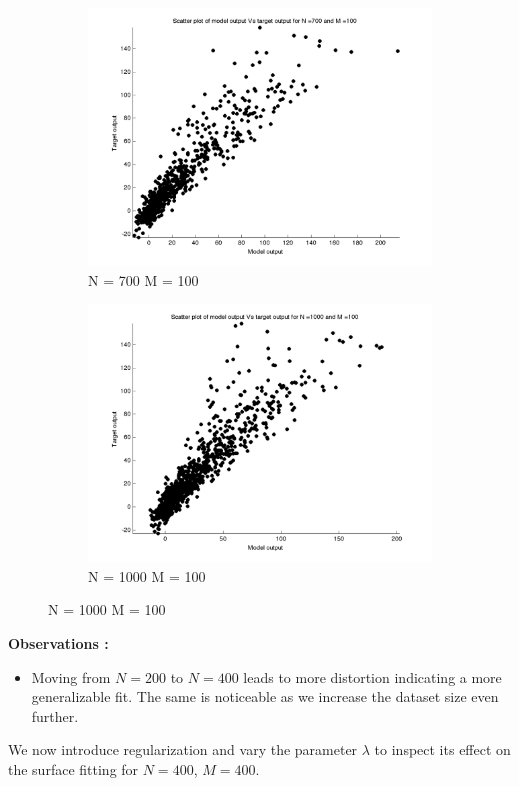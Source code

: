 \documentclass{article}
\begin{document}
\begin{figure}[H]
\begin{subfigure}{.5\textwidth}
\centering
\includegraphics[width=\linewidth]{D2/Scatter/VaryingN_N700M100}
\caption{N = 700 M = 100}
\end{subfigure}
\begin{subfigure}{.5\textwidth}
\includegraphics[width=\linewidth]{D2/Scatter/VaryingN_N1000M100}
\caption{N = 1000 M = 100}
\end{subfigure}



\end{figure}


\textbf{Observations :}

\begin{itemize}
\item Moving from $N=200$ to $N=400$ leads to more distortion indicating a more generalizable fit. The same is noticeable as we increase the dataset size even further.
\end{itemize}
\newpage
We now introduce regularization and vary the parameter $\lambda$ to inspect its effect on the surface fitting for $N=400$, $M=400$.
\end{document}
